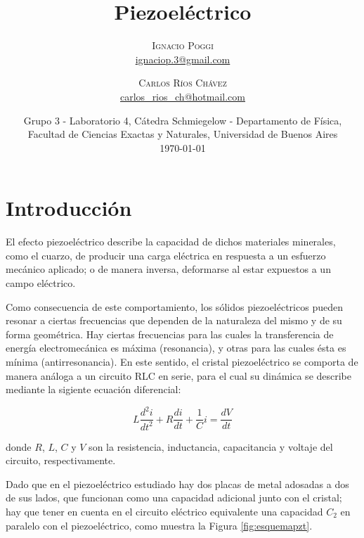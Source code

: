 \documentclass[twoside,twocolumn,a4paper]{article}
\title{Piezoel\'ectrico} %
\author{%
\textsc{Ignacio Poggi} \\[1ex] %
\normalsize \href{mailto:ignaciop.3@gmail.com}{ignaciop.3@gmail.com} %
\and %
\textsc{Carlos R\'ios Ch\'avez} \\[1ex] %
\normalsize \href{mailto:carlos_rios_ch@hotmail.com}{carlos\_rios\_ch@hotmail.com} %
}
\date{Grupo 3 - Laboratorio 4, C\'atedra Schmiegelow - Departamento de F\'isica, Facultad de Ciencias Exactas y Naturales, Universidad de Buenos Aires \newline \\ \today} %
\begin{document}
\maketitle



\section{Introducci\'on}



El efecto piezoel\'ectrico describe la capacidad de dichos materiales minerales, como el cuarzo, de producir una carga el\'ectrica en respuesta a un esfuerzo mec\'anico aplicado; o de manera inversa, deformarse al estar expuestos a un campo el\'ectrico. \newline

\par
Como consecuencia de este comportamiento, los s\'olidos piezoel\'ectricos pueden resonar a ciertas frecuencias que dependen de la naturaleza del mismo y de su forma geom\'etrica. Hay ciertas frecuencias para las cuales la transferencia de energ\'ia electromec\'anica es m\'axima (resonancia), y otras para las cuales \'esta es m\'inima (antirresonancia). En este sentido, el cristal piezoel\'ectrico se comporta de manera an\'aloga a un circuito RLC en serie, para el cual su din\'amica se describe mediante la sigiente ecuaci\'on diferencial:

\begin{equation}
\label{eq:oderlc}
L\frac{d^{2}i}{dt^{2}} + R\frac{di}{dt} + \frac{1}{C}i = \frac{dV}{dt}
\end{equation}

donde $R$, $L$, $C$ y $V$ son la resistencia, inductancia, capacitancia y voltaje del circuito, respectivamente. \newline


\par
Dado que en el piezoel\'ectrico estudiado hay dos placas de metal adosadas a dos de sus lados, que funcionan como una capacidad adicional junto con el cristal; hay que tener en cuenta en el circuito el\'ectrico equivalente una capacidad $C_{2}$ en paralelo con el piezoel\'ectrico, como muestra la Figura \ref{fig:esquemapzt}.
\end{document}
